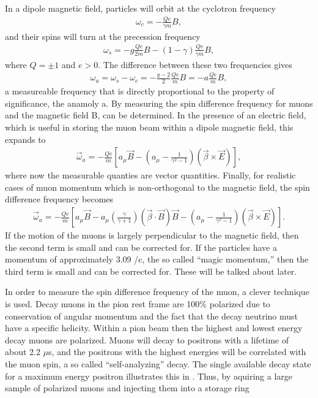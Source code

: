 In a dipole magnetic field, particles will orbit at the cyclotron frequency 
        \begin{align} \label{eq:wc}
        	\omega_{c} = -\frac{Qe}{\gamma m}B,
        \end{align}
and their spins will turn at the precession frequency
        \begin{align} \label{eq:ws}
        	\omega_{s} = -g\frac{Qe}{2m}B - (1-\gamma)\frac{Qe}{\gamma m}B,
        \end{align}
where $Q = \pm 1$ and $e > 0$. The difference between these two frequencies gives
        \begin{align} \label{eq:wasimple}
        	\omega_{a} = \omega_{s} - \omega_{c} = -\frac{g-2}{2}\frac{Qe}{m}B = - a \frac{Qe}{m}B,
        \end{align}
a measureable frequency that is directly proportional to the property of significance, the anamoly a. By measuring the spin difference frequency for muons and the magnetic field B, \amu can be determined. In the presence of an electric field, which is useful in storing the muon beam within a dipole magnetic field, this expands to 
        \begin{align} \label{eq:waelectric}
            \vec{\omega}_{a} = -\frac{Qe}{m} [a_{\mu}\vec{B} - (a_{\mu} - \frac{1}{\gamma^{2}-1})(\vec{\beta} \times \vec{E}) ],
        \end{align}
where now the measurable quanties are vector quantities. Finally, for realistic cases of muon momentum which is non-orthogonal to the magnetic field, the spin difference frequency becomes
        \begin{align} \label{eq:wafinal}
            \vec{\omega}_{a} = -\frac{Qe}{m} [a_{\mu}\vec{B} - a_{\mu} (\frac{\gamma}{\gamma+1})(\vec{\beta} \cdot \vec{B})\vec{B} - (a_{\mu} - \frac{1}{\gamma^{2}-1})(\vec{\beta} \times \vec{E}) ].
        \end{align}
If the motion of the muons is largely perpendicular to the magnetic field, then the second term is small and can be corrected for. If the particles have a momentum of approximately 3.09 \GeV/c, the so called ``magic momentum,'' then the third term is small and can be corrected for. These will be talked about later.

In order to measure the spin difference frequency of the muon, a clever technique is used. Decay muons in the pion rest frame are 100\% polarized due to conservation of angular momentum and the fact that the decay neutrino must have a specific helicity. Within a pion beam then the highest and lowest energy decay muons are polarized. Muons will decay to positrons with a lifetime of about 2.2 $\mu$s, and the positrons with the highest energies will be correlated with the muon spin, a so called ``self-analyzing'' decay. The single available decay state for a maximum energy positron illustrates this in . Thus, by aquiring a large sample of polarized muons and injecting them into a storage ring 



